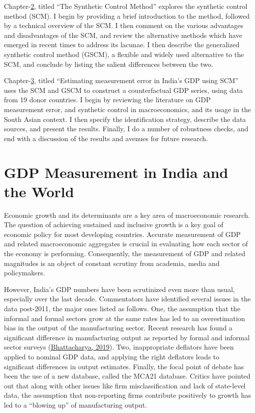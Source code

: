 \documentclass[12pt,nobind, a4paper]{reedthesis}
\begin{document}
 Chapter-\protect\hyperlink{ch2}{2}, titled ``The Synthetic Control Method'' explores the synthetic control method (SCM). I begin by providing a brief introduction to the method, followed by a technical overview of the SCM. I then comment on the various advantages and disadvantages of the SCM, and review the alternative methods which have emerged in recent times to address its lacunae. I then describe the generalized synthetic control method (GSCM), a flexible and widely used alternative to the SCM, and conclude by listing the salient differences between the two. \linebreak

 Chapter-\protect\hyperlink{ch3}{3}, titled ``Estimating measurement error in India's GDP using SCM'' uses the SCM and GSCM to construct a counterfactual GDP series, using data from 19 donor countries. I begin by reviewing the literature on GDP measurement error, and synthetic control in macroeconomics, and its usage in the South Asian context. I then specify the identification strategy, describe the data sources, and present the results. Finally, I do a number of robustness checks, and end with a discussion of the results and avenues for future research.

 \hypertarget{ch1}{%
 \chapter{GDP Measurement in India and the World}\label{ch1}}

 Economic growth and its determinants are a key area of macroeconomic research. The question of achieving sustained and inclusive growth is a key goal of economic policy for most developing countries. Accurate measurement of GDP and related macroeconomic aggregates is crucial in evaluating how each sector of the economy is performing. Consequently, the measurement of GDP and related magnitudes is an object of constant scrutiny from academia, media and policymakers.
 \linebreak

 However, India's GDP numbers have been scrutinized even more than usual, especially over the last decade. Commentators have identified several issues in the data post-2011, the major ones listed as follows. One, the assumption that the informal and formal sectors grow at the same rates has led to an overestimation bias in the output of the manufacturing sector. Recent research has found a significant difference in manufacturing output as reported by formal and informal sector surveys (\protect\hyperlink{ref-bhattacharya_great_2019}{Bhattacharya, 2019}). Two, inappropriate deflators have been applied to nominal GDP data, and applying the right deflators leads to significant differences in output estimates. Finally, the focal point of debate has been the use of a new database, called the MCA21 database. Critics have pointed out that along with other issues like firm misclassification and lack of state-level data, the assumption that non-reporting firms contribute positively to growth has led to a ``blowing up'' of manufacturing output.
 \linebreak
\end{document}
